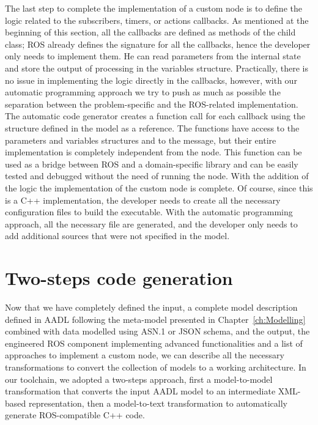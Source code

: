 The last step to complete the implementation of a custom node is to define the logic related to the subscribers, timers, or actions callbacks. As mentioned at the beginning of this section, all the callbacks are defined as methods of the child class; ROS already defines the signature for all the callbacks, hence the developer only needs to implement them. He can read parameters from the internal state and store the output of processing in the variables structure. Practically, there is no issue in implementing the logic directly in the callbacks, however, with our automatic programming approach we try to push as much as possible the separation between the problem-specific and the ROS-related implementation. The automatic code generator creates a function call for each callback using the structure defined in the model as a reference. The functions have access to the parameters and variables structures and to the message, but their entire implementation is completely independent from the node. This function can be used as a bridge between ROS and a domain-specific library and can be easily tested and debugged without the need of running the node. With the addition of the logic the implementation of the custom node is complete. Of course, since this is a C++ implementation, the developer needs to create all the necessary configuration files to build the executable. With the automatic programming approach, all the necessary file are generated, and the developer only needs to add additional sources that were not specified in the model.

\section{Two-steps code generation}
Now that we have completely defined the input, a complete model description defined in AADL following the meta-model presented in Chapter~\ref{ch:Modelling} combined with data modelled using ASN.1 or JSON schema, and the output, the engineered ROS component implementing advanced functionalities and a list of approaches to implement a custom node, we can describe all the necessary transformations to convert the collection of models to a working architecture. In our toolchain, we adopted a two-steps approach, first a model-to-model transformation that converts the  input AADL model to an intermediate XML-based representation, then a model-to-text transformation to automatically generate ROS-compatible C++ code.

